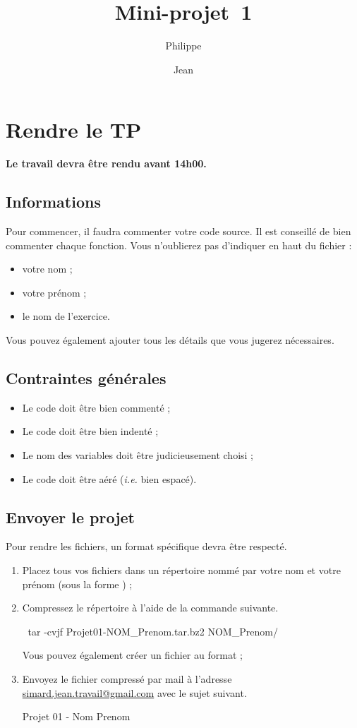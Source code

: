 \documentclass[a4paper]{article}
\title{Mini-projet~1}
\author{Philippe \Nom{Rinaudo}\and{}Jean \Nom{Simard}}
\date{\Date[l]{14}{10}{2009}}
\begin{document}
	\maketitle
	\section{Rendre le TP}
		\textbf{Le travail devra être rendu  avant 14h00.}
		\subsection{Informations}
			Pour commencer, il faudra commenter votre code source.
			Il est conseillé de bien commenter chaque fonction.
			Vous n'oublierez pas d'indiquer en haut du fichier :
			\begin{itemize}
				\item votre nom ;
				\item votre prénom ;
				\item le nom de l'exercice.
			\end{itemize}
			Vous pouvez également ajouter tous les détails que vous jugerez nécessaires.

		\subsection{Contraintes générales}
			\begin{itemize}
				\item Le code doit être bien commenté ;
				\item Le code doit être bien indenté ;
				\item Le nom des variables doit être judicieusement choisi ;
				\item Le code doit être aéré (\emph{i.e.} bien espacé).
			\end{itemize}

		\subsection{Envoyer le projet}
			Pour rendre les fichiers, un format spécifique devra être respecté.
			\begin{enumerate}
				\item Placez tous vos fichiers dans un répertoire nommé par votre nom et votre prénom (sous la forme ) ;
				\item Compressez le répertoire à l'aide de la commande suivante.
				\begin{Code*}
$~$ tar -cvjf Projet01-NOM_Prenom.tar.bz2 NOM_Prenom/
				\end{Code*}
				Vous pouvez également créer un fichier au format  ;
				\item Envoyez le fichier compressé  par mail à l'adresse \href{mailto:simard.jean.travail@gmail.com}{simard.jean.travail@gmail.com} avec le sujet suivant.
				\begin{Code*}
[CCI] Projet 01 - Nom Prenom
				\end{Code*}
			\end{enumerate}
\end{document}
